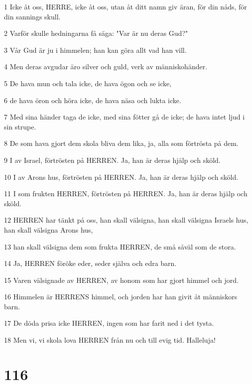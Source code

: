 \par 1 Icke åt oss, HERRE, icke åt oss, utan åt ditt namn giv äran, för din nåds, för din sannings skull.
\par 2 Varför skulle hedningarna få säga: "Var är nu deras Gud?"
\par 3 Vår Gud är ju i himmelen; han kan göra allt vad han vill.
\par 4 Men deras avgudar äro silver och guld, verk av människohänder.
\par 5 De hava mun och tala icke, de hava ögon och se icke,
\par 6 de hava öron och höra icke, de hava näsa och lukta icke.
\par 7 Med sina händer taga de icke, med sina fötter gå de icke; de hava intet ljud i sin strupe.
\par 8 De som hava gjort dem skola bliva dem lika, ja, alla som förtrösta på dem.
\par 9 I av Israel, förtrösten på HERREN. Ja, han är deras hjälp och sköld.
\par 10 I av Arons hus, förtrösten på HERREN. Ja, han är deras hjälp och sköld.
\par 11 I som frukten HERREN, förtrösten på HERREN. Ja, han är deras hjälp och sköld.
\par 12 HERREN har tänkt på oss, han skall välsigna, han skall välsigna Israels hus, han skall välsigna Arons hus,
\par 13 han skall välsigna dem som frukta HERREN, de små såväl som de stora.
\par 14 Ja, HERREN föröke eder, seder själva och edra barn.
\par 15 Varen välsignade av HERREN, av honom som har gjort himmel och jord.
\par 16 Himmelen är HERRENS himmel, och jorden har han givit åt människors barn.
\par 17 De döda prisa icke HERREN, ingen som har farit ned i det tysta.
\par 18 Men vi, vi skola lova HERREN från nu och till evig tid. Halleluja!

\chapter{116}

